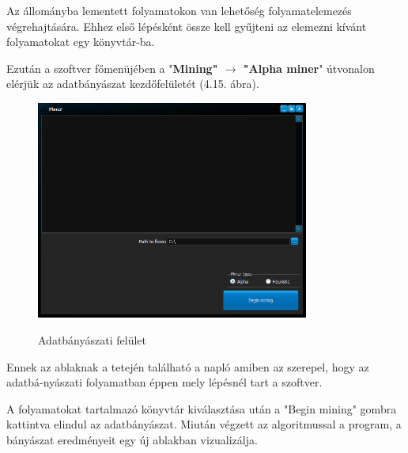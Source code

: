 Az állományba lementett folyamatokon van lehetőség folyamatelemezés végrehajtására. Ehhez első lépésként össze kell gyűjteni az elemezni kívánt folyamatokat egy könyvtár\hyp{}ba.

Ezután a szoftver főmenüjében a "\textbf{Mining" $\rightarrow$ "Alpha miner}" útvonalon elérjük az adatbányászat kezdőfelületét (4.15. ábra).

\begin{figure}[h!]
	\begin{center}
		\includegraphics[width=0.8\textwidth, keepaspectratio=true]{images/img_datamining_ui}\\
		\caption{Adatbányászati felület}
		\label{fig:example}
	\end{center}
\end{figure}

Ennek az ablaknak a tetején található a napló amiben az szerepel, hogy az adatbá\hyp{}nyászati folyamatban éppen mely lépésnél tart a szoftver.

A folyamatokat tartalmazó könyvtár kiválasztása után a "Begin mining" gombra kattintva elindul az adatbányászat. Miután végzett az algoritmussal a program, a bányászat eredményeit egy új ablakban vizualizálja.

